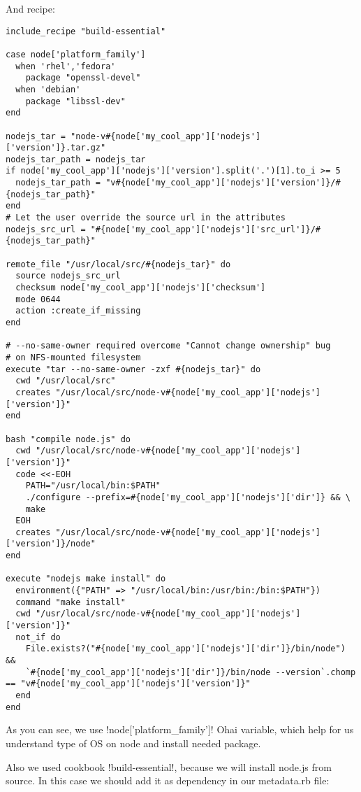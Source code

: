 And recipe:

\begin{lstlisting}[label=lst:cookbook-ohai-recipe-before,title=my-server-cloud/site-cookbooks/my\_cool\_app/recipes/node.rb]
include_recipe "build-essential"

case node['platform_family']
  when 'rhel','fedora'
    package "openssl-devel"
  when 'debian'
    package "libssl-dev"
end

nodejs_tar = "node-v#{node['my_cool_app']['nodejs']['version']}.tar.gz"
nodejs_tar_path = nodejs_tar
if node['my_cool_app']['nodejs']['version'].split('.')[1].to_i >= 5
  nodejs_tar_path = "v#{node['my_cool_app']['nodejs']['version']}/#{nodejs_tar_path}"
end
# Let the user override the source url in the attributes
nodejs_src_url = "#{node['my_cool_app']['nodejs']['src_url']}/#{nodejs_tar_path}"

remote_file "/usr/local/src/#{nodejs_tar}" do
  source nodejs_src_url
  checksum node['my_cool_app']['nodejs']['checksum']
  mode 0644
  action :create_if_missing
end

# --no-same-owner required overcome "Cannot change ownership" bug
# on NFS-mounted filesystem
execute "tar --no-same-owner -zxf #{nodejs_tar}" do
  cwd "/usr/local/src"
  creates "/usr/local/src/node-v#{node['my_cool_app']['nodejs']['version']}"
end

bash "compile node.js" do
  cwd "/usr/local/src/node-v#{node['my_cool_app']['nodejs']['version']}"
  code <<-EOH
    PATH="/usr/local/bin:$PATH"
    ./configure --prefix=#{node['my_cool_app']['nodejs']['dir']} && \
    make
  EOH
  creates "/usr/local/src/node-v#{node['my_cool_app']['nodejs']['version']}/node"
end

execute "nodejs make install" do
  environment({"PATH" => "/usr/local/bin:/usr/bin:/bin:$PATH"})
  command "make install"
  cwd "/usr/local/src/node-v#{node['my_cool_app']['nodejs']['version']}"
  not_if do
    File.exists?("#{node['my_cool_app']['nodejs']['dir']}/bin/node") &&
    `#{node['my_cool_app']['nodejs']['dir']}/bin/node --version`.chomp == "v#{node['my_cool_app']['nodejs']['version']}"
  end
end
\end{lstlisting}

As you can see, we use \inline!node['platform_family']! Ohai variable, which help for us understand type of OS on node and install needed package.

Also we used cookbook \inline!build-essential!, because we will install node.js from source. In this case we should add it as dependency in our metadata.rb file:

